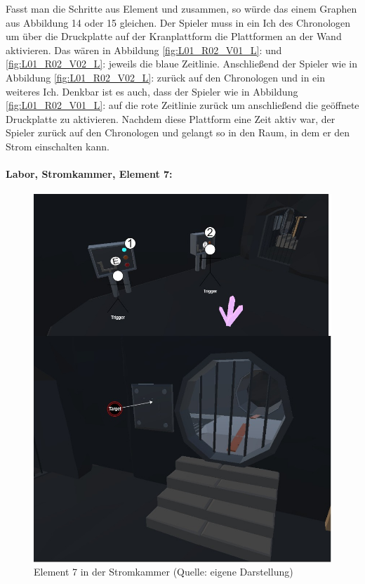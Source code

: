Fasst man die Schritte aus Element  und  zusammen, so würde das einem Graphen aus Abbildung 14 oder 15 gleichen. Der Spieler muss in ein Ich des Chronologen  um über die Druckplatte auf der Kranplattform die Plattformen an der Wand aktivieren. Das wären in Abbildung \ref{fig:L01_R02_V01_L}:  und \ref{fig:L01_R02_V02_L}:  jeweils die blaue Zeitlinie. Anschließend  der Spieler wie in Abbildung \ref{fig:L01_R02_V02_L}:  zurück auf den Chronologen und  in ein weiteres Ich. Denkbar ist es auch, dass der Spieler wie in Abbildung \ref{fig:L01_R02_V01_L}:  auf die rote Zeitlinie zurück  um anschließend die geöffnete Druckplatte zu aktivieren. Nachdem diese Plattform eine Zeit aktiv war,  der Spieler zurück auf den Chronologen und gelangt so in den Raum, in dem er den Strom einschalten kann.

\paragraph{Labor, Stromkammer, Element 7:}\label{p:lse7}

\begin{figure}[ht]
\centering
\includegraphics[width=0.8\linewidth]{content/pictures/Raetsel-L02_R01_R07.jpg}
\caption{Element 7 in der Stromkammer (Quelle: eigene Darstellung)}
\label{fig:L02_R01_R07}
\end{figure}

